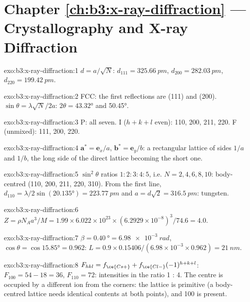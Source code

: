 \section*{Chapter \ref{ch:b3:x-ray-diffraction} --- Crystallography and X-ray Diffraction}

\begin{solution}{exo:b3:x-ray-diffraction:1}
$d = a/\sqrt N$: $d_{111} = \qty{325.66}{pm}$, $d_{200} = \qty{282.03}{pm}$, $d_{220} =
\qty{199.42}{pm}$.
\end{solution}

\begin{solution}{exo:b3:x-ray-diffraction:2}
FCC: the first reflections are (111) and (200). $\sin\theta = \lambda\sqrt N/2a$: $2\theta =
\ang{43.32}$ and \ang{50.45}.
\end{solution}

\begin{solution}{exo:b3:x-ray-diffraction:3}
P: all seven. I ($h + k + l$ even): 110, 200, 211, 220. F (unmixed): 111, 200, 220.
\end{solution}

\begin{solution}{exo:b3:x-ray-diffraction:4}
$\mathbf a^* = \mathbf e_x/a$, $\mathbf b^* = \mathbf e_y/b$: a rectangular lattice of sides $1/a$
and $1/b$, the long side of the direct lattice becoming the short one.
\end{solution}

\begin{solution}{exo:b3:x-ray-diffraction:5}
$\sin^2\theta$ ratios $1 : 2 : 3 : 4 : 5$, i.e. $N = 2, 4, 6, 8, 10$: body-centred (110,
200, 211, 220, 310). From the first line, $d_{110} = \lambda/2\sin(\ang{20.135}) =
\qty{223.77}{pm}$ and $a = d\sqrt2 = \qty{316.5}{pm}$: tungsten.
\end{solution}

\begin{solution}{exo:b3:x-ray-diffraction:6}
$Z = \rho N_Aa^3/M = 1.99 \times 6.022\times10^{23} \times (6.2929\times10^{-8})^3/74.6 = 4.0$.
\end{solution}

\begin{solution}{exo:b3:x-ray-diffraction:7}
$\beta = \qty{0.40}{\degree} = \qty{6.98e-3}{rad}$, $\cos\theta = \cos\ang{15.85} = 0.962$:
$L = 0.9 \times 0.15406/(6.98\times10^{-3} \times 0.962) = \qty{21}{nm}$.
\end{solution}

\begin{solution}{exo:b3:x-ray-diffraction:8}
$F_{hkl} = f_{\ce{Cs+}} + f_{\ce{Cl-}}(-1)^{h+k+l}$: $F_{100} = 54 - 18 = 36$, $F_{110} = 72$:
intensities in the ratio 1 : 4. The centre is occupied by a different ion from
the corners: the lattice is primitive (a body-centred lattice needs identical
contents at both points), and 100 is present.
\end{solution}

